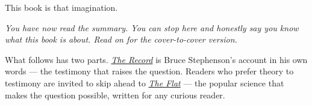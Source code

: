 This book is that imagination.

\vspace{1cm}
\begin{center}
\textit{You have now read the summary. You can stop here and honestly say you know what this book is about. Read on for the cover-to-cover version.}
\end{center}

\medskip

\noindent What follows has two parts.
\textit{\hyperref[the-record]{The Record}} is Bruce Stephenson's account in his own words ---
the testimony that raises the question. Readers who prefer theory to testimony are
invited to skip ahead to \textit{\hyperref[the-flat]{The Flat}} --- the popular science
that makes the question possible, written for any curious reader.
